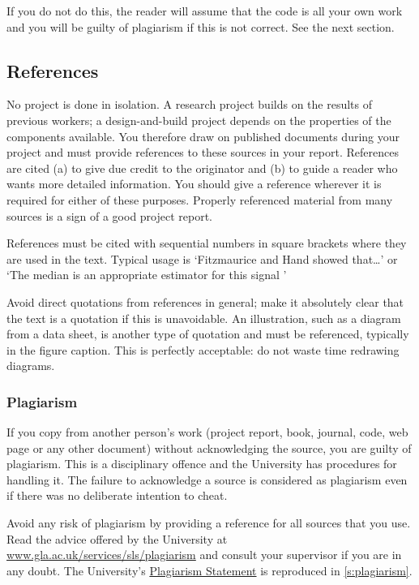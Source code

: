 If you do not do this, the reader will assume that the code is all your own work
and you will be guilty of plagiarism if this is not correct. See the next
section.

\subsection{References}

No project is done in isolation. A research project builds on the results of
previous workers; a design-and-build project depends on the properties of the
components available. You therefore draw on published documents during your
project and must provide references to these sources in your report. References
are cited (a) to give due credit to the originator and (b) to guide a reader who
wants more detailed information. You should give a reference wherever it is
required for either of these purposes. Properly referenced material from many
sources is a sign of a good project report.

References must be cited with sequential numbers in square brackets where they
are used in the text. Typical usage is `Fitzmaurice and Hand
\autocite{fitzmaurice1987comparison} showed that\ldots’ or `The median is an
appropriate estimator for this signal \autocite{fitzmaurice1987comparison}'

Avoid direct quotations from references in general; make it absolutely clear
that the text is a quotation if this is unavoidable. An illustration, such as a
diagram from a data sheet, is another type of quotation and must be referenced,
typically in the figure caption. This is perfectly acceptable: do not waste time
redrawing diagrams.

\subsubsection{Plagiarism}

If you copy from another person’s work (project report, book, journal, code, web
page or any other document) without acknowledging the source, you are guilty of
plagiarism. This is a disciplinary offence and the University has procedures for
handling it. The failure to acknowledge a source is considered as plagiarism
even if there was no deliberate intention to cheat.

Avoid any risk of plagiarism by providing a reference for all sources that you
use. Read the advice offered by the University at
\url{www.gla.ac.uk/services/sls/plagiarism} and consult your supervisor if you
are in any doubt. The University’s
\href{http://www.gla.ac.uk/services/senateoffice/studentcodes/staff/plagiarism/plagiarismstatement/}{Plagiarism
    Statement} is reproduced in \autoref{s:plagiarism}.

